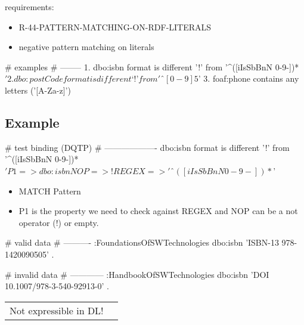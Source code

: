 \documentclass{llncs}
\newenvironment{DL}{
  \vspace{0cm}
	\begin{center}
  \begin{tabular}{r l}

}{
  \end{tabular}
	\end{center}
}
\begin{document}
requirements:

\begin{itemize}
  \item R-44-PATTERN-MATCHING-ON-RDF-LITERALS
\end{itemize}



\begin{itemize}
	\item negative pattern matching on literals
\end{itemize}

\begin{ex}
# examples
# --------
1. dbo:isbn format is different ’!’ from '^([iIsSbBnN 0-9-])*$'
2. dbo:postCode format is different ‘!’ from 'ˆ[0-9]{5}$'
3. foaf:phone contains any letters ('[A-Za-z]')
\end{ex}

\subsection{Example}

\begin{ex}
# test binding (DQTP)
# -------------------
dbo:isbn format is different ’!’ from '^([iIsSbBnN 0-9-])*$'

P1 => dbo:isbn
NOP => !
REGEX => 'ˆ([iIsSbBnN 0-9-])*$'
\end{ex}


\begin{itemize}
	\item MATCH Pattern \cite{Kontokostas2014} 
  \item P1 is the property we need to check against REGEX and
NOP can be a not operator (!) or empty.
\end{itemize}

\begin{ex}
# valid data
# ----------
:FoundationsOfSWTechnologies
    dbo:isbn 'ISBN-13 978-1420090505' .
\end{ex}

\begin{ex}
# invalid data
# ------------
:HandbookOfSWTechnologies
    dbo:isbn 'DOI 10.1007/978-3-540-92913-0' .
\end{ex}

\begin{DL}
Not expressible in DL!
\end{DL}
\end{document}
